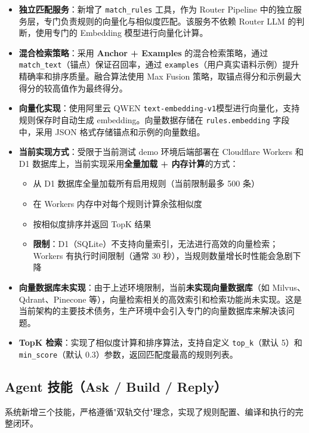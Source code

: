 \documentclass[UTF8]{ctexart}
\begin{document}
\begin{itemize}
    \item \textbf{独立匹配服务}：新增了 \texttt{match\_rules} 工具，作为 Router Pipeline 中的独立服务层，专门负责规则的向量化与相似度匹配。该服务不依赖 Router LLM 的判断，使用专门的 Embedding 模型进行向量化计算。
    \item \textbf{混合检索策略}：采用 \textbf{Anchor + Examples} 的混合检索策略，通过 \texttt{match\_text}（锚点）保证召回率，通过 \texttt{examples}（用户真实语料示例）提升精确率和排序质量。融合算法使用 Max Fusion 策略，取锚点得分和示例最大得分的较高值作为最终得分。
    \item \textbf{向量化实现}：使用阿里云 QWEN \texttt{text-embedding-v1}模型进行向量化，支持规则保存时自动生成 embedding。向量数据存储在 \texttt{rules.embedding} 字段中，采用 JSON 格式存储锚点和示例的向量数组。
    \item \textbf{当前实现方式}：受限于当前测试 demo 环境后端部署在 Cloudflare Workers 和 D1 数据库上，当前实现采用\textbf{全量加载 + 内存计算}的方式：
    \begin{itemize}
        \item 从 D1 数据库全量加载所有启用规则（当前限制最多 500 条）
        \item 在 Workers 内存中对每个规则计算余弦相似度
        \item 按相似度排序并返回 TopK 结果
        \item \textbf{限制}：D1（SQLite）不支持向量索引，无法进行高效的向量检索；Workers 有执行时间限制（通常 30 秒），当规则数量增长时性能会急剧下降
    \end{itemize}
    \item \textbf{向量数据库未实现}：由于上述环境限制，当前\textbf{未实现向量数据库}（如 Milvus、Qdrant、Pinecone 等），向量检索相关的高效索引和检索功能尚未实现。这是当前架构的主要技术债务，生产环境中会引入专门的向量数据库来解决该问题。
    \item \textbf{TopK 检索}：实现了相似度计算和排序算法，支持自定义 \texttt{top\_k}（默认 5）和 \texttt{min\_score}（默认 0.3）参数，返回匹配度最高的规则列表。
\end{itemize}

\subsection{Agent 技能（Ask / Build / Reply）}

系统新增三个技能，严格遵循"双轨交付"理念，实现了规则配置、编译和执行的完整闭环。
\end{document}
